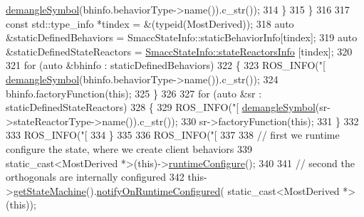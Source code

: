 \begin{DoxyCode}
{{{{      \hyperlink{namespacesmacc_1_1introspection_a2f495108db3e57604d8d3ff5ef030302}{demangleSymbol}(bhinfo.behaviorType->name()).c\_str());
314         \}
315       \}
316 
317       \textcolor{keyword}{const} std::type\_info *tindex = &(\textcolor{keyword}{typeid}(MostDerived));
318       \textcolor{keyword}{auto} &staticDefinedBehaviors = SmaccStateInfo::staticBehaviorInfo[tindex];
319       \textcolor{keyword}{auto} &staticDefinedStateReactors = \hyperlink{classsmacc_1_1introspection_1_1SmaccStateInfo_abd1d6ca5060c87f6bd11fde3e5b2ac4d}{SmaccStateInfo::stateReactorsInfo}
      [tindex];
320 
321       \textcolor{keywordflow}{for} (\textcolor{keyword}{auto} &bhinfo : staticDefinedBehaviors)
322       \{
323         ROS\_INFO(\textcolor{stringliteral}{"[%
      \hyperlink{namespacesmacc_1_1introspection_a2f495108db3e57604d8d3ff5ef030302}{demangleSymbol}(bhinfo.behaviorType->name()).c\_str());
324         bhinfo.factoryFunction(\textcolor{keyword}{this});
325       \}
326 
327       \textcolor{keywordflow}{for} (\textcolor{keyword}{auto} &sr : staticDefinedStateReactors)
328       \{
329         ROS\_INFO(\textcolor{stringliteral}{"[%
      \hyperlink{namespacesmacc_1_1introspection_a2f495108db3e57604d8d3ff5ef030302}{demangleSymbol}(sr->stateReactorType->name()).c\_str());
330         sr->factoryFunction(\textcolor{keyword}{this});
331       \}
332 
333       ROS\_INFO(\textcolor{stringliteral}{"[%
334     \}
335 
336     ROS\_INFO(\textcolor{stringliteral}{"[%
337 
338     \textcolor{comment}{// first we runtime configure the state, where we create client behaviors}
339     \textcolor{keyword}{static\_cast<}MostDerived *\textcolor{keyword}{>}(\textcolor{keyword}{this})->\hyperlink{classsmacc_1_1SmaccState_a6995704a0232e24f4c38250302c0a01f}{runtimeConfigure}();
340 
341     \textcolor{comment}{// second the orthogonals are internally configured}
342     this->\hyperlink{classsmacc_1_1SmaccState_afc39f8e0ca4001b2159a100da2fccd0e}{getStateMachine}().\hyperlink{classsmacc_1_1ISmaccStateMachine_a7377ca0f79289fdc27f9ed3ff6e67263}{notifyOnRuntimeConfigured}(
      static\_cast<MostDerived *>(\textcolor{keyword}{this}));
}}}}}}}}
\end{DoxyCode}
